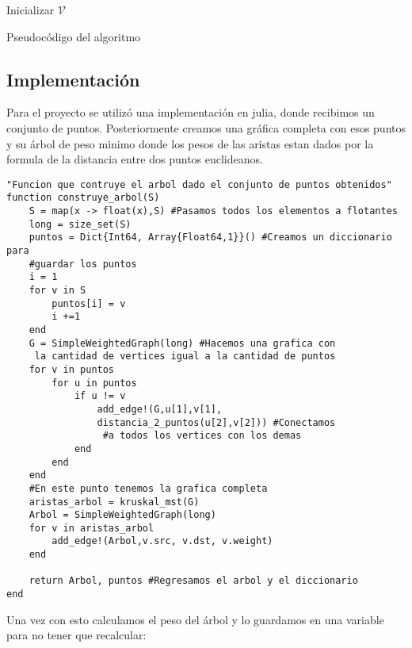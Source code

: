 \documentclass[11pt,letterpaper]{article}
\begin{document}
\begin{algorithm}[H]
	Inicializar $\mathcal{V}$
	
	\caption{Pseudocódigo del algoritmo}
\end{algorithm}




\subsection{Implementación}

Para el proyecto se utilizó una implementación en julia, donde recibimos un conjunto de puntos.
Posteriormente creamos una gráfica completa con esos puntos y su árbol de peso minimo donde los pesos de las aristas estan dados por la formula de la distancia entre dos puntos euclideanos.


\begin{lstlisting}
"Funcion que contruye el arbol dado el conjunto de puntos obtenidos"
function construye_arbol(S)
	S = map(x -> float(x),S) #Pasamos todos los elementos a flotantes
	long = size_set(S)
	puntos = Dict{Int64, Array{Float64,1}}() #Creamos un diccionario para
	#guardar los puntos
	i = 1
	for v in S
		puntos[i] = v
		i +=1
	end
	G = SimpleWeightedGraph(long) #Hacemos una grafica con
	 la cantidad de vertices igual a la cantidad de puntos
	for v in puntos
		for u in puntos
			if u != v
				add_edge!(G,u[1],v[1],
				distancia_2_puntos(u[2],v[2])) #Conectamos
				 #a todos los vertices con los demas
			end
		end
	end
	#En este punto tenemos la grafica completa
	aristas_arbol = kruskal_mst(G)
	Arbol = SimpleWeightedGraph(long)
	for v in aristas_arbol
		add_edge!(Arbol,v.src, v.dst, v.weight)
	end
	
	return Arbol, puntos #Regresamos el arbol y el diccionario
end
\end{lstlisting}

Una vez con esto calculamos el peso del árbol y lo guardamos en una variable para no tener que recalcular:
\end{document}
